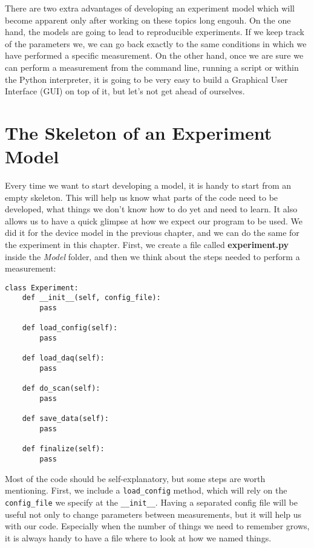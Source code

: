 There are two extra advantages of developing an experiment model which will become apparent only after working on these topics long engouh. On the one hand, the models are going to lead to reproducible experiments. If we keep track of the parameters we, we can go back exactly to the same conditions in which we have performed a specific measurement. On the other hand, once we are sure we can perform a measurement from the command line, running a script or within the Python interpreter, it is going to be very easy to build a Graphical User Interface ({GUI}) on top of it, but let's not get ahead of ourselves.

\section{The Skeleton of an Experiment Model}\label{section:skeleton-experiment-model}
Every time we want to start developing a model, it is handy to start from an empty skeleton. This will help us know what parts of the code need to be developed, what things we don't know how to do yet and need to learn. It also allows us to have a quick glimpse at how we expect our program to be used. We did it for the device model in the previous chapter, and we can do the same for the experiment in this chapter. First, we create a file called \textbf{experiment.py} inside the \emph{Model} folder, and then we think about the steps needed to perform a measurement:

\begin{verbatim}
class Experiment:
    def __init__(self, config_file):
        pass

    def load_config(self):
        pass

    def load_daq(self):
        pass

    def do_scan(self):
        pass

    def save_data(self):
        pass

    def finalize(self):
        pass

\end{verbatim}

Most of the code should be self-explanatory, but some steps are worth mentioning. First, we include a \texttt{load\_config} method, which will rely on the \texttt{config\_file} we specify at the \texttt{\_\_init\_\_}. Having a separated config file will be useful not only to change parameters between measurements, but it will help us with our code. Especially when the number of things we need to remember grows, it is always handy to have a file where to look at how we named things.

